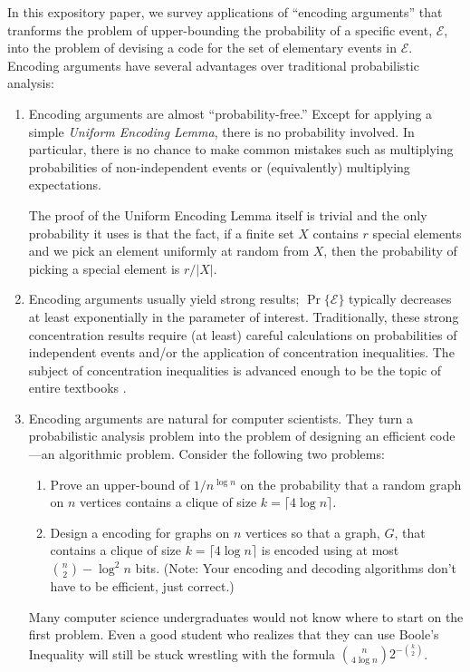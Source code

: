 \documentclass{patmorin}
\begin{document}
In this expository paper, we survey applications of ``encoding arguments''
that tranforms the problem of upper-bounding the probability of a specific
event, $\mathcal{E}$, into the problem of devising a code for the set
of elementary events in 
$\mathcal{E}$.  Encoding arguments have several advantages over
traditional probabilistic analysis:

\begin{enumerate}
  \item Encoding arguments are almost ``probability-free.''  Except for
  applying a simple \emph{Uniform Encoding Lemma}, there is no probability
  involved.  In particular, there is no chance to make common mistakes
  such as multiplying probabilities of non-independent events or
  (equivalently) multiplying expectations.

  The proof of the Uniform Encoding Lemma itself is trivial and the only
  probability it uses is that the fact, if a finite set $X$ contains $r$
  special elements and we pick an element uniformly at random from $X$,
  then the probability of picking a special element is $r/|X|$.

  \item Encoding arguments usually yield strong results;
  $\Pr\{\mathcal{E}\}$ typically decreases at least exponentially in
  the parameter of interest. Traditionally, these strong concentration
  results require (at least) careful calculations on probabilities of
  independent events and/or the application of concentration inequalities.
  The subject of concentration inequalities is advanced enough to be
  the topic of entire textbooks \cite{boucheron.lugosi.ea:concentration,dubhashi.panconesi:concentration}.
  
  \item Encoding arguments are natural for computer scientists. They
  turn a probabilistic analysis problem into the problem of designing an
  efficient code---an algorithmic problem. Consider the following 
  two problems:
    \begin{enumerate}

    \item Prove an upper-bound of $1/n^{\log n}$ on the probability that
       a random graph on $n$ vertices contains a clique of size $k=\lceil
       4\log n\rceil$.

    \item Design a encoding for graphs on $n$ vertices so that a graph,
       $G$, that contains a clique of size $k=\lceil 4\log n\rceil$
       is encoded using at most $\binom{n}{2}-\log^2 n$ bits. (Note:
       Your encoding and decoding algorithms don't have to be efficient,
       just correct.)
    \end{enumerate}
  Many computer science undergraduates would not know where to start
  on the first problem.  Even a good student who realizes that
  they can use Boole's Inequality will still be stuck
  wrestling with the formula $\binom{n}{4\log n}2^{-\binom{k}{2}}$.  
\end{enumerate}
\end{document}
